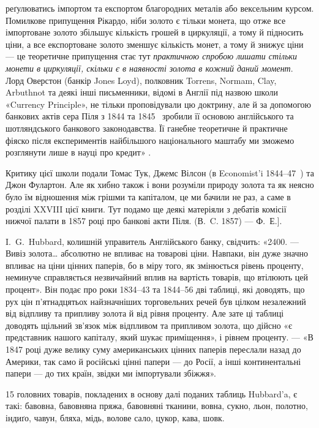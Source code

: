 \parcont{}  %
реґулюватись імпортом та експортом благородних металів або вексельним курсом.
Помилкове припущення Рікардо, ніби золото є тільки монета, що отже все імпортоване
золото збільшує кількість грошей в циркуляції, а тому й підносить ціни,
а все експортоване золото зменшує кількість монет, а тому й знижує ціни —
це теоретичне припущення стає тут \emph{практичною спробою лишати стільки
монети в циркуляції, скільки є в наявності золота в кожний даний
момент}. Лорд Оверстон (банкір Jones Loyd), полковник Torrens, Normam, Clay,
Arbuthnot та деякі інші письменники, відомі в Англії під назвою школи «Currency
Principle», не тільки проповідували цю доктрину, але й за допомогою банкових
актів сера Піля з 1844 та 1845~ зробили її основою англійського та шотляндського
банкового законодавства. Її ганебне теоретичне й практичне фіяско після
експериментів найбільшого національного маштабу ми зможемо розглянути лише
в науці про кредит» .

Критику цієї школи подали Томас Тук, Джемс Вілсон (в Economist’i 1844--47~)
та Джон Фулартон. Але як хибно також і вони розуміли природу золота
та як неясно було їм відношення між грішми та капіталом, це ми бачили не
раз, а саме в розділі XXVIII цієї книги. Тут подамо ще деякі матеріяли з дебатів
комісії нижчої палати в 1857 році про банкові акти Піля. (В.~C. 1857) — Ф.~Е.].

I.~G.~Hubbard, колишній управитель Англійського банку, свідчить: «2400. —
Вивіз золота\dots{} абсолютно не впливає на товарові ціни. Навпаки, він дуже
значно впливає на ціни цінних паперів, бо в міру того, як змінюється рівень
проценту, неминуче справляється незвичайний вплив на вартість товарів, що втілюють
цей процент». Він подає про роки 1834--43 та 1844--56 дві таблиці,
які доводять, що рух цін п’ятнадцятьох найзначніших торговельних речей був
цілком незалежний від відпливу та припливу золота й від рівня проценту. Але
зате ці таблиці доводять щільний зв’язок між відпливом та припливом золота,
що дійсно «є представник нашого капіталу, який шукає приміщення», і рівнем
проценту. — «В 1847 році дуже велику суму американських цінних паперів переслали
назад до Америки, так само й російські цінні папери — до Росії, а інші
континентальні папери — до тих країн, звідки ми імпортували збіжжя».

15 головних товарів, покладених в основу далі поданих таблиць Hubbard’a,
є такі: бавовна, бавовняна пряжа, бавовняні тканини, вовна, сукно,
льон, полотно, індиґо, чавун, бляха, мідь, волове сало, цукор, кава, шовк.

